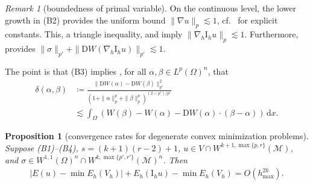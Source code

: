 \documentclass[a4paper]{amsart}
\numberwithin{equation}{section}
\renewcommand{\d}[1]{\,\mathrm{d}#1}
\newcommand{\I}{\mathrm{I}}
\newcommand{\Mcal}{\mathcal{M}}
\newcommand{\D}{\mathrm{D}}
\newtheorem{proposition}[theorem]{Proposition}
\theoremstyle{remark}
\newtheorem{remark}[theorem]{Remark}
\begin{document}
\begin{remark}[boundedness of primal variable]\label{rem:bdd-primal-variable}
	On the continuous level, the lower growth in (B2) provides the uniform bound
	$\|\nabla u\|_p \lesssim 1$,
	cf.~\cite{CPlechac1997} for explicit constants. This, a triangle inequality, and  imply $\|\nabla_h \mathrm{I}_h u\|_p \lesssim 1$.
	Furthermore, \cite[Lemma 2.1(a)]{CarstensenTran2021} provides
	$\|\sigma\|_{p'} + \|\D W(\nabla_h \I_h u)\|_{p'} \lesssim 1$.
\end{remark}

The point is that (B3) implies \cite{GlowinskiMarrocco1975,Chow1989,CPlechac1997},
for all $\alpha,\beta \in L^p(\Omega)^n$, that  
\begin{align}\label{ineq:cc-continuous}
    \delta(\alpha,\beta) &\coloneqq \frac{\|\D W(\alpha) - \D W(\beta)\|_{p'}^2}{(1 + \|\alpha\|^p_{p} + \|\beta\|_{p}^p)^{(2-p')/p'}}\nonumber\\
    &\lesssim \int_\Omega (W(\beta) - W(\alpha) - \D W(\alpha) \cdot (\beta - \alpha)) \d{x}.
\end{align}


\begin{proposition}[convergence rates for degenerate convex minimization problems]\label{prop:conv-rates}
Suppose (B1)--(B4), $s = (k+1)(r-2)+1$, $u \in V \cap W^{k+1,\max\{p,r\}}(\Mcal)$,
    and $\sigma \in W^{1,1}(\Omega)^n \cap W^{k,\max\{p',r'\}}(\Mcal)^n$. Then
	\begin{align*}
		|E(u) - \min E_h(V_h)| + E_h(\mathrm{I}_h u) - \min E_h(V_h) 
        =O(h_\mathrm{max}^{2k}).
	\end{align*}
\end{proposition}
\end{document}
